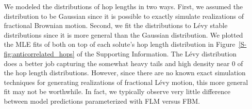 \documentclass[journal=ancac3,manuscript=article,layout=twocolumn]{achemso}
\begin{document}
  
  We modeled the distributions of hop lengths in two ways. First, we assumed
  the distribution to be Gaussian since it is possible to exactly simulate
  realizations of fractional Brownian motion. Second, we fit the distributions
  to L\'evy stable distributions since it is more general than the Gaussian
  distribution. We plotted the MLE fits of both on top of each solute's hop length
  distribution in Figure~\ref{S-fig:anticorrelated_hops} of the
  Supporting Information. The L\'evy distribution does a better job capturing
  the somewhat heavy tails and high density near 0 of the hop length distributions. 
  However, since there are no known exact simulation techniques for generating 
  realizations of fractional L\'evy motion, this more general fit may not be 
  worthwhile. In fact, we typically observe very little difference between model
  predictions parameterized with FLM versus FBM.%
\end{document}
